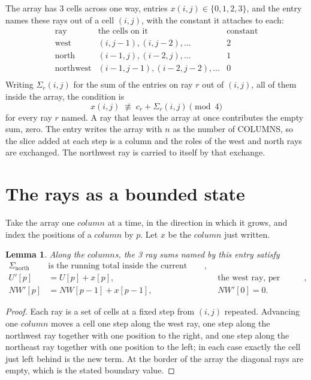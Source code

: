 \documentclass[11pt,a4paper]{article}
\theoremstyle{plain}
\newtheorem{lemma}[theorem]{Lemma}
\theoremstyle{definition}
\begin{document}
The array has $3$ cells across one way, entries $x(i,j)\in\{0,1,2,3\}$, and the entry names these
rays out of a cell $(i,j)$, with the constant it attaches to each:
\[
\begin{array}{lll}
\text{ray} & \text{the cells on it} & \text{constant} \\[2pt]
\text{west} & (i,j-1),(i,j-2),\dots & 2 \\
\text{north} & (i-1,j),(i-2,j),\dots & 1 \\
\text{northwest} & (i-1,j-1),(i-2,j-2),\dots & 0 \\
\end{array}
\]
Writing $\Sigma_r(i,j)$ for the sum of the entries on ray $r$ out of $(i,j)$, all of them
inside the array, the condition is
\[
x(i,j)\;\not\equiv\;c_r+\Sigma_r(i,j) \pmod{4}
\]
for every ray $r$ named. A ray that leaves the array at once contributes the empty sum,
zero. The entry writes the array with $n$ as the number of COLUMNS, so the slice added at each step is a column and the roles of the west and north rays are exchanged. The northwest ray is carried to itself by that exchange.

\section{The rays as a bounded state}

Take the array one $column$ at a time, in the direction in which it grows, and index the
positions of a $column $ by $p$. Let $x$ be the $column$ just written.

\begin{lemma}\label{lem:rays}
Along the $column$s, the 3 ray sums named by this entry satisfy
\[
\begin{aligned}
\Sigma_{\mathrm{north}}\ &\text{is the running total inside the current column},\\
U'[p]&=U[p]+x[p], &&\text{the west ray, per position},\\
NW'[p]&=NW[p-1]+x[p-1], && NW'[0]=0 .
\end{aligned}
\]
\end{lemma}

\begin{proof}
Each ray is a set of cells at a fixed step from $(i,j)$ repeated. Advancing one $column$
moves a cell one step along the west ray, one step along the northwest ray together with one
position to the right, and one step along the northeast ray together with one position to the
left; in each case exactly the cell just left behind is the new term. At the border of the
array the diagonal rays are empty, which is the stated boundary value.
\end{proof}
\end{document}
